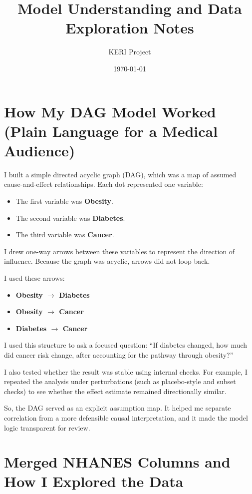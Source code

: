 \documentclass[12pt]{article}
\title{Model Understanding and Data Exploration Notes}
\author{KERI Project}
\date{\today}
\begin{document}
\maketitle

\section{How My DAG Model Worked (Plain Language for a Medical Audience)}

I built a simple directed acyclic graph (DAG), which was a map of assumed cause-and-effect relationships.
Each dot represented one variable:
\begin{itemize}
	\item The first variable was \textbf{Obesity}.
	\item The second variable was \textbf{Diabetes}.
	\item The third variable was \textbf{Cancer}.
\end{itemize}

I drew one-way arrows between these variables to represent the direction of influence.
Because the graph was acyclic, arrows did not loop back.

I used these arrows:
\begin{itemize}
	\item \textbf{Obesity $\rightarrow$ Diabetes}
	\item \textbf{Obesity $\rightarrow$ Cancer}
	\item \textbf{Diabetes $\rightarrow$ Cancer}
\end{itemize}

I used this structure to ask a focused question:
``If diabetes changed, how much did cancer risk change, after accounting for the pathway through obesity?''

I also tested whether the result was stable using internal checks.
For example, I repeated the analysis under perturbations (such as placebo-style and subset checks) to see whether the effect estimate remained directionally similar.

So, the DAG served as an explicit assumption map.
It helped me separate correlation from a more defensible causal interpretation,
and it made the model logic transparent for review.

\section{Merged NHANES Columns and How I Explored the Data}
\end{document}
